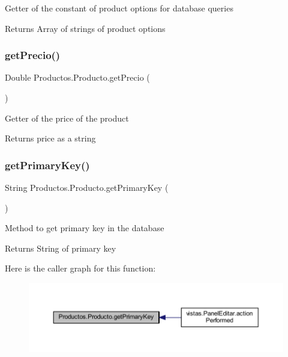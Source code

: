 Getter of the constant of product options for database queries

\begin{DoxyReturn}{Returns}
Array of strings of product options 
\end{DoxyReturn}
\mbox{\label{class_productos_1_1_producto_aceed34a26585af33140a3d9232d0cc64}} 
\subsubsection{\texorpdfstring{get\+Precio()}{getPrecio()}}
{\footnotesize\ttfamily Double Productos.\+Producto.\+get\+Precio (\begin{DoxyParamCaption}{ }\end{DoxyParamCaption})}

Getter of the price of the product

\begin{DoxyReturn}{Returns}
price as a string 
\end{DoxyReturn}
\mbox{\label{class_productos_1_1_producto_a3b9f2b2cfcbbc5708e65dbfeee373528}} 
\subsubsection{\texorpdfstring{get\+Primary\+Key()}{getPrimaryKey()}}
{\footnotesize\ttfamily String Productos.\+Producto.\+get\+Primary\+Key (\begin{DoxyParamCaption}{ }\end{DoxyParamCaption})}

Method to get primary key in the database

\begin{DoxyReturn}{Returns}
String of primary key 
\end{DoxyReturn}
Here is the caller graph for this function\+:
\nopagebreak
\begin{figure}[H]
\begin{center}
\leavevmode
\includegraphics[width=350pt]{class_productos_1_1_producto_a3b9f2b2cfcbbc5708e65dbfeee373528_icgraph}
\end{center}
\end{figure}
\mbox{\label{class_productos_1_1_producto_a0516e55bd0c688748075bb13fd949595}} 
